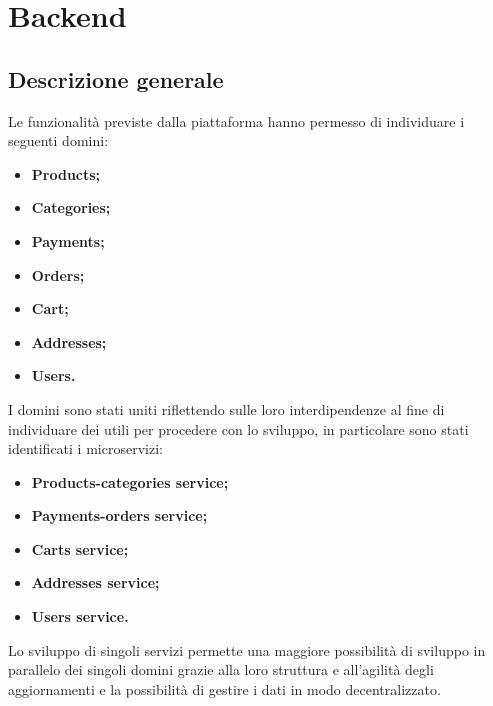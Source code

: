 \section{Backend}
\subsection{Descrizione generale}\label{beDescrizione}
Le funzionalità previste dalla piattaforma hanno permesso di individuare i seguenti domini:
\begin{itemize}
	\item \textbf{Products;}
	\item \textbf{Categories;}
	\item \textbf{Payments;}
	\item \textbf{Orders;}
	\item \textbf{Cart;}
	\item \textbf{Addresses;}
	\item \textbf{Users.}
\end{itemize}
I domini sono stati uniti riflettendo sulle loro interdipendenze al fine di individuare dei  utili per procedere con lo sviluppo, in particolare sono stati identificati i microservizi:
\begin{itemize}
	\item \textbf{Products-categories service;}
	\item \textbf{Payments-orders service;}
	\item \textbf{Carts service;}
	\item \textbf{Addresses service;}
	\item \textbf{Users service.}
\end{itemize}
Lo sviluppo di singoli servizi permette una maggiore possibilità di sviluppo in parallelo dei singoli domini grazie alla loro struttura e all'agilità degli aggiornamenti e la possibilità di gestire i dati in modo decentralizzato.

